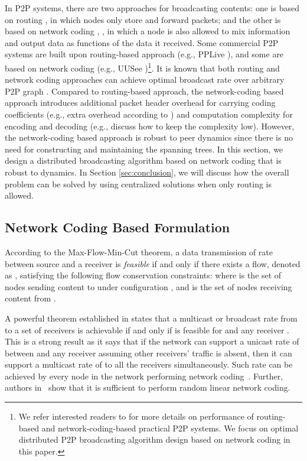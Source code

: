 \documentclass[10pt,conference]{IEEEtran}
\begin{document}
In P2P systems, there are two approaches for broadcasting contents:
one is based on routing \cite{liu2008opportunities}, in which nodes only store and forward packets;
and the other is based on network coding \cite{all:NetCod:ACLY00}, \cite{liu2008opportunities},
in which a node is also allowed to mix information and output data
as functions of the data it received. Some commercial P2P systems
are built upon routing-based approach (e.g., PPLive \cite{all:pplive}),
and some are based on network coding (e.g., UUSee \cite{all:uusee,liu-uusee})\footnote{We refer interested readers to \cite{liu-uusee,hei2007msl}
for more details on performance of routing-based and network-coding-based
practical P2P systems. We focus on optimal distributed P2P broadcasting
algorithm design based on network coding in this paper. }. It is known that both routing and network coding approaches can
achieve optimal broadcast rate over arbitrary P2P graph \cite{chen2008ump,massoulie2007rdb}.
Compared to routing-based approach, the network-coding based approach introduces additional packet
header overhead for carrying coding coefficients (e.g.,  extra overhead according to \cite{chou2003practical}) and computation complexity for encoding and decoding (e.g., \cite{wang2007r,liu-uusee} discuss how to keep the complexity low). However, the network-coding based approach is robust to peer dynamics since there is no need
for constructing and maintaining the spanning trees. In this
section, we design a distributed broadcasting algorithm based on network
coding that is robust to dynamics. In Section \ref{sec:conclusion}, we will discuss how the overall problem can be solved by using centralized solutions when only routing is allowed.

\subsection{Network Coding Based Formulation}\label{subsec:nc-formulation}

According to the Max-Flow-Min-Cut theorem, a data transmission of rate
 between source  and a receiver  is \emph{feasible}
if and only if there exists a flow, denoted as ,
satisfying the following flow conservation constraints: 
 where  is the set of nodes
sending content to  under configuration , and 
is the set of nodes receiving content from  .

A powerful theorem established in \cite{all:NetCod:ACLY00} states
that a multicast or broadcast rate  from
 to a set of receivers is achievable if and only if  is feasible
for  and any receiver . This is
a strong result as it says that if the network can support a unicast
rate of  between  and any receiver assuming other receivers'
traffic is absent, then it can support a multicast rate of  to
all the receivers simultaneously. Such rate  can be achieved by every
node in the network performing network coding~\cite{all:NetCod:ACLY00}. Further, authors in~\cite{ho2009dynamic,chou2003practical}
show that it is sufficient to perform random linear network coding.
\end{document}
